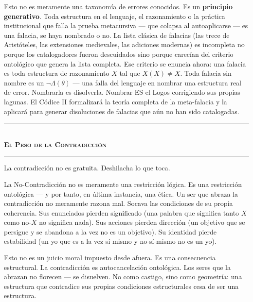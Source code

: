 \documentclass[10pt, openany, oneside]{book}
\renewcommand{\normalsize}{\fontsize{10}{13}\selectfont}
\begin{document}
Esto no es meramente una taxonomía de errores conocidos. Es un \textbf{principio generativo}. Toda estructura en el lenguaje, el razonamiento o la práctica institucional que falla la prueba metacursiva --- que colapsa al autoaplicarse --- es una falacia, se haya nombrado o no. La lista clásica de falacias (las trece de Aristóteles, las extensiones medievales, las adiciones modernas) es incompleta no porque los catalogadores fueron descuidados sino porque carecían del criterio ontológico que genera la lista completa. Ese criterio se enuncia ahora: una falacia es toda estructura de razonamiento $X$ tal que $X(X) \neq X$. Toda falacia sin nombre es un $\neg\Lambda(\theta)$ --- una falla del lenguaje en nombrar una estructura real de error. Nombrarla es disolverla. Nombrar ES el Logos corrigiendo sus propias lagunas. El Códice II formalizará la teoría completa de la meta-falacia y la aplicará para generar disoluciones de falacias que aún no han sido catalogadas.

\vspace{1.5em}


\begin{center}
    \rule{0.3\textwidth}{0.4pt}\\[0.5em]
    {\normalsize\bfseries\scshape El Peso de la Contradicción}\\[0.3em]
    \rule{0.3\textwidth}{0.4pt}
\end{center}

\vspace{1em}

\noindent La contradicción no es gratuita. Deshilacha lo que toca.

La No-Contradicción no es meramente una restricción lógica. Es una restricción ontológica --- y por tanto, en última instancia, una ética. Un ser que abraza la contradicción no meramente razona mal. Socava las condiciones de su propia coherencia. Sus enunciados pierden significado (una palabra que significa tanto $X$ como no-$X$ no significa nada). Sus acciones pierden dirección (un objetivo que se persigue y se abandona a la vez no es un objetivo). Su identidad pierde estabilidad (un yo que es a la vez sí mismo y no-sí-mismo no es un yo).

Esto no es un juicio moral impuesto desde afuera. Es una consecuencia estructural. La contradicción es autocancelación ontológica. Los seres que la abrazan no florecen --- se disuelven. No como castigo, sino como geometría: una estructura que contradice sus propias condiciones estructurales cesa de ser una estructura.
\end{document}
